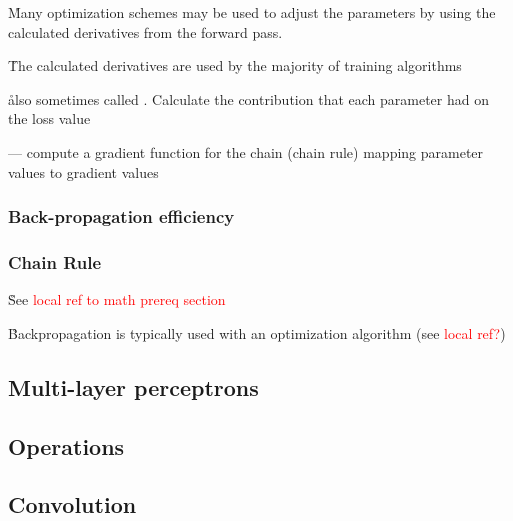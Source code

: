 \r{Many optimization schemes  may be used to adjust the parameters by using the calculated derivatives from the forward pass.}

\r{The calculated derivatives are used by the majority of training algorithms}





\r{also sometimes called .  Calculate the contribution that each parameter had on the loss value}

\r{ --- compute a gradient function for the chain (chain rule) mapping parameter values to gradient values}

\subsubsection{Back-propagation efficiency}


\subsubsection{Chain Rule}

\r{See \textcolor{red}{local ref to math prereq section}}


\r{Backpropagation is typically used with an optimization algorithm (see \textcolor{red}{local ref?})}

\subsection{Multi-layer perceptrons}


\subsection{Operations}

\subsection{Convolution}

